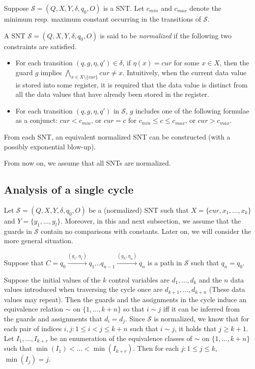 \documentclass[runningheads,a4paper]{llncs}
\def\Ss{{\mathcal{S} }}
\begin{document}
Suppose $\Ss=(Q,X,Y,\delta,q_0,O)$ is a SNT. Let $c_{min}$ and $c_{max}$ denote the minimum resp. maximum constant occurring in the transitions of $\Ss$. 


A SNT $\Ss=(Q,X,Y,\delta,q_0,O)$ is said to be \emph{normalized} if the following two constraints are satisfied.
\begin{itemize}
\item For each transition $(q,g,\eta,q') \in \delta$, if $\eta(x)=cur$ for some $x \in X$, then the guard $g$ implies $\bigwedge \limits_{x \in X \setminus \{cur\}} cur \neq x$.  Intuitively, when the current data value is stored into some register, it is required that the data value is distinct from all the data values that have already been stored in the register.
%
\item For each transition $(q, g, \eta, q')$ in $\Ss$, $g$ includes one of the following formulae as a conjunct: $cur < c_{min}$, or $cur = c$ for $c_{min} \le c \le c_{max}$, or $cur > c_{max}$.
\end{itemize}


\begin{proposition}
From each SNT, an equivalent normalized SNT can be constructed (with a possibly exponential blow-up). 
\end{proposition}

From now on, we assume that all SNTs are normalized.


\subsection{Analysis of a single cycle}

Let $\Ss = (Q,X,Y,\delta,q_0,O)$ be a (normalized) SNT such that $X=\{cur, x_1,\dots, x_k\}$ and $Y = \{y_1,\dots,y_l\}$. Moreover, in this and next subsection, we assume that the guards in $\Ss$ contain no comparisons with constants. Later on, we will consider the more general situation.

Suppose that $C=q_0 \xrightarrow{(g_1,\eta_1)} q_1 \dots q_{n-1} \xrightarrow{(g_n, \eta_n)} q_n$ is a path in $\Ss$ such that $q_n = q_0$.  

Suppose the initial values of the $k$ control variables are $d_1,\dots, d_k$ and the $n$ data values introduced when traversing the cycle once are $d_{k+1},\dots,d_{k+n}$ (These data values may repeat). Then the guards and the assignments in the cycle induce an equivalence relation $\sim$ on $\{1,\dots, k+n\}$ so that  $i \sim j$ iff it can be inferred from the guards and assignments that $d_i = d_j$. Since $\Ss$ is normalized, we know that for each pair of indices $i,j: 1 \le i < j \le k+n$ such that $i \sim j$, it holds that $j \ge k+1$. Let $I_1,\dots, I_{k+r}$ be an enumeration of the equivalence classes of $\sim$ on $\{1,\dots, k+n\}$ such that $\min(I_1) < \dots < \min(I_{k+r})$. Then for each $j: 1 \le j \le k$, $\min(I_j)=j$.
\end{document}
